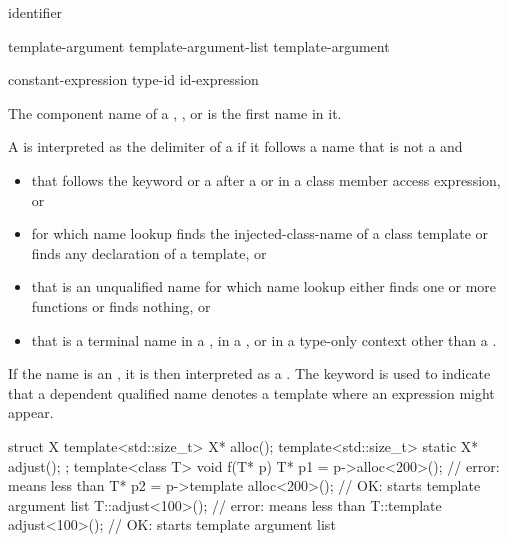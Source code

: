 \begin{bnf}
\br
  identifier
\end{bnf}

\begin{bnf}
\br
  template-argument \br
  template-argument-list \terminal{,} template-argument 
\end{bnf}

\begin{bnf}
\br
  constant-expression\br
  type-id\br
  id-expression
\end{bnf}

\pnum
{}%
The component name of a
,
, or
is the first name in it.

\pnum
A \tcode{<} is interpreted as the delimiter of
a 
if it follows a name that is not a  and
\begin{itemize}
\item
that follows the keyword  or a \tcode{\~}
after a  or
in a class member access expression, or
\item
for which name lookup finds the injected-class-name of a class template or
finds any declaration of a template, or
\item
that is an unqualified name
for which name lookup either finds one or more functions or finds nothing, or
\item
that is a terminal name
in a ,
in a , or
in a type-only context
other than a .
\end{itemize}
\begin{note}
If the name is an ,
it is then interpreted as a .
The keyword  is used to indicate
that a dependent qualified name denotes a template
where an expression might appear.
\end{note}
\begin{example}
\begin{codeblock}
struct X {
  template<std::size_t> X* alloc();
  template<std::size_t> static X* adjust();
};
template<class T> void f(T* p) {
  T* p1 = p->alloc<200>();              // error: \tcode{<} means less than
  T* p2 = p->template alloc<200>();     // OK: \tcode{<} starts template argument list
  T::adjust<100>();                     // error: \tcode{<} means less than
  T::template adjust<100>();            // OK: \tcode{<} starts template argument list
}
\end{codeblock}
\end{example}

